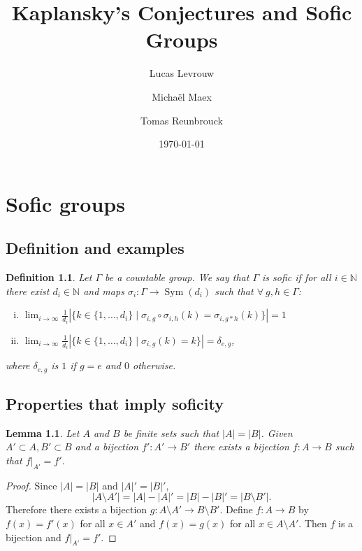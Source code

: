 \documentclass[a4paper]{report}
\author{Lucas Levrouw \and Michaël Maex \and Tomas Reunbrouck}
\title{Kaplansky's Conjectures and Sofic Groups}
\date{\today}
\newcommand{\N}{\mathbb{N}}
\newcommand{\card}[1]{\left| #1 \right|}
\DeclareMathOperator{\sym}{Sym}
\newtheorem{definition}{Definition}
\newtheorem{lemma}{Lemma}
\begin{document}
    \maketitle
{}

    \chapter{Sofic groups}

\section{Definition and examples}

    \begin{definition}\label{def:Sofic}
        Let $\Gamma$ be a countable group. We say that $\Gamma$ is sofic if for all $i\in \N$ there exist $d_i \in \N$ and maps $\sigma_i : \Gamma \to \sym(d_i)$ such that $\forall\ g, h \in \Gamma$:
        \begin{enumerate}[(i)]
            \item $\displaystyle \lim_{i\to \infty} \frac{1}{d_i} \card{\big\{k \in \{1, \dots, d_i\} \mid \sigma_{i,g} \circ \sigma_{i,h}(k) = \sigma_{i, g*h} (k) \big\}} = 1$
            \item $\displaystyle \lim_{i\to \infty} \frac{1}{d_i}  \card{\big\{k \in \{1, \dots, d_i\} \mid \sigma_{i,g}(k) = k \big\}} = \delta_{e,g}$,
        \end{enumerate}
        where $\delta_{e,g}$ is $1$ if $g = e$ and $0$ otherwise.
    \end{definition}





    \section{Properties that imply soficity}

    \begin{lemma}\label{lem:finite_bijections} 
        Let $A$ and $B$ be finite sets such that $|A| = |B|$. Given $A' \subset A, B' \subset B$ and a bijection $f': A' \to B'$ there exists a bijection $f: A \to B$ such that $f|_{A'} = f'$. 
    \end{lemma}
    \begin{proof}
        Since $\card A = \card B$ and $\card A' = \card B'$,
        \[
        \card{A \setminus A'} = \card A - \card A' = \card B - \card B' = \card{B \setminus B'}.
        \]
        Therefore there exists a bijection $g: A \setminus A' \to B \setminus B'$. Define $f: A  \to B$ by $f(x) = f'(x)$ for all $x \in A'$ and $f(x)=g(x)$ for all $x \in A \setminus A'$. Then $f$ is a bijection and $f|_{A'} = f'$.
    \end{proof}
\end{document}
